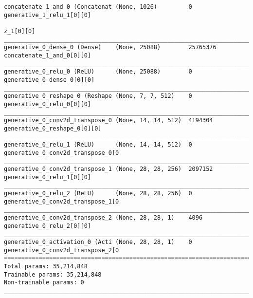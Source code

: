 \begin{lstlisting}[caption={\textsc{Mnist}-\ac{VLAE}-\ac{GAN} Decoder},captionpos=b,basicstyle=\tiny, label={lst:mnist-vlae-gan-decoder}]
concatenate_1_and_0 (Concatenat (None, 1026)         0           generative_1_relu_1[0][0]
                                                                 z_1[0][0]
__________________________________________________________________________________________________
generative_0_dense_0 (Dense)    (None, 25088)        25765376    concatenate_1_and_0[0][0]
__________________________________________________________________________________________________
generative_0_relu_0 (ReLU)      (None, 25088)        0           generative_0_dense_0[0][0]
__________________________________________________________________________________________________
generative_0_reshape_0 (Reshape (None, 7, 7, 512)    0           generative_0_relu_0[0][0]
__________________________________________________________________________________________________
generative_0_conv2d_transpose_0 (None, 14, 14, 512)  4194304     generative_0_reshape_0[0][0]
__________________________________________________________________________________________________
generative_0_relu_1 (ReLU)      (None, 14, 14, 512)  0           generative_0_conv2d_transpose_0[0
__________________________________________________________________________________________________
generative_0_conv2d_transpose_1 (None, 28, 28, 256)  2097152     generative_0_relu_1[0][0]
__________________________________________________________________________________________________
generative_0_relu_2 (ReLU)      (None, 28, 28, 256)  0           generative_0_conv2d_transpose_1[0
__________________________________________________________________________________________________
generative_0_conv2d_transpose_2 (None, 28, 28, 1)    4096        generative_0_relu_2[0][0]
__________________________________________________________________________________________________
generative_0_activation_0 (Acti (None, 28, 28, 1)    0           generative_0_conv2d_transpose_2[0
==================================================================================================
Total params: 35,214,848
Trainable params: 35,214,848
Non-trainable params: 0
__________________________________________________________________________________________________
\end{lstlisting}